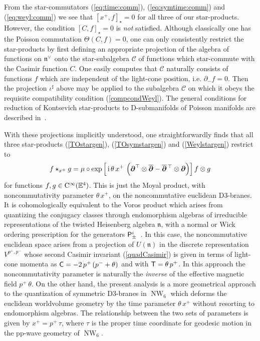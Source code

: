 \documentclass[11pt,a4paper]{article}
\DeclareMathOperator{\NW}{NW}
\newcommand{\1}{\mathbb{1}}
\newcommand{\mbf}[1]{{\boldsymbol {#1} }}
\def\ii{{\,{\rm i}\,}}
\def\CC{{\rm C}}
\def\P{{\sf P}}
\def\T{{\sf T}}
\def\mdell{{\mbf\partial}}
\def\mfn{{\mathfrak n}}
\newcommand{\eucl}{{\mathbb E}}
\newcommand{\beq}{\begin{eqnarray}}
\newcommand{\eeq}{\end{eqnarray}}
\begin{document}
{}From the star-commutators (\ref{eq:time:comm}),
(\ref{eq:symtime:comm}) and (\ref{eq:weyl:comm}) we see that
$[x^+,f]_\star=0$ for all three of our star-products. However, the
condition $[C,f]_\star=0$ is {\it not} satisfied. Although classically
one has the Poisson commutation $\Theta(C,f)=0$, one can only
consistently restrict the star-products by first defining an
appropriate projection of the algebra of functions on $\mfn^{\vee\,}$ onto
the star-subalgebra $\mathcal{C}$ of functions which star-commute with
the Casimir function $C$. One easily computes that $\mathcal{C}$
naturally consists of functions $f$ which are independent of
the light-cone position, i.e. $\partial_-f=0$. Then the projection
$\iota^\sharp$ above may be applied to the subalgebra $\mathcal{C}$
on which it obeys the requisite compatibility condition
(\ref{compcondWeyl}). The general conditions for reduction of
Kontsevich star-products to D-submanifolds of Poisson manifolds are
described in~\cite{CattFel2,CFal1}.

With these projections implicitly understood, one straightforwardly
finds that all three star-products (\ref{TOstargen}),
(\ref{TOsymstargen}) and (\ref{Weylstargen}) restrict to
\beq
f\star_{x^+}g=\mu\circ\exp\left[\ii\theta\,x^+\,\left(
\mdell^\top\otimes\overline{\mdell}-
{\overline{\mdell}}{}^{\,\top}\otimes\mdell\right)\right]f\otimes g
\label{fstargrestrict}\eeq
for functions $f,g\in\CC^\infty(\eucl^4)$. This is just the Moyal
product, with noncommutativity parameter $\theta\,x^+$, on the
noncommutative euclidean D3-branes. It is cohomologically equivalent
to the Voros product which arises from quantizing the conjugacy
classes through endomorphism algebras of irreducible representations
of the twisted Heisenberg algebra $\mfn$, with a normal or Wick
ordering prescription for the generators $\P_\pm^i$~\cite{HSz1}. In
this case, the noncommutative euclidean space arises from a projection
of $U(\mfn)$ in the discrete representation $V^{p^+,p^-}$ whose second
Casimir invariant (\ref{quadCasimir}) is given in terms of light-cone
momenta as ${\sf C}=-2\,p^+\,(p^-+\theta)$ and with $\T=\theta\,p^+$. In this
approach the noncommutativity parameter is naturally the {\it inverse}
of the effective magnetic field $p^+\,\theta$. On the other hand, the
present analysis is a more geometrical approach to the quantization of
symmetric D3-branes in $\NW_6$ which deforms the euclidean worldvolume
geometry by the time parameter $\theta\,x^+$ without resorting to
endomorphism algebras. The relationship between the two sets of
parameters is given by $x^+=p^+\,\tau$, where $\tau$ is the proper
time coordinate for geodesic motion in the pp-wave geometry of
$\NW_6$.
\end{document}
